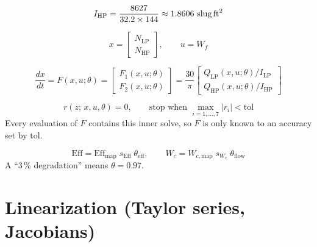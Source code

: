 \documentclass[11pt,a4paper]{article}
\begin{document}
\begin{equation}
  I_{\mathrm{HP}} = \frac{8627}{32.2 \times 144} \approx 1.8606\ \text{slug\,ft}^2
  \label{eq:inertia-hp}
\end{equation}

\begin{equation}
  x = \begin{bmatrix} N_{\mathrm{LP}} \\ N_{\mathrm{HP}} \end{bmatrix},
  \qquad u = W_f
  \label{eq:state}
\end{equation}

\begin{equation}
  \frac{dx}{dt} = F(x,u;\theta)
  = \begin{bmatrix} F_1(x,u;\theta) \\ F_2(x,u;\theta) \end{bmatrix}
  = \frac{30}{\pi}
    \begin{bmatrix}
      Q_{\mathrm{LP}}(x,u;\theta) / I_{\mathrm{LP}} \\[2pt]
      Q_{\mathrm{HP}}(x,u;\theta) / I_{\mathrm{HP}}
    \end{bmatrix}
  \label{eq:state-equation}
\end{equation}

\begin{equation}
  r(z;\,x,u,\theta) = 0, \qquad \text{stop when } \max_{i=1,\dots,7} |r_i| < \mathrm{tol}
  \label{eq:inner-solver}
\end{equation}
Every evaluation of $F$ contains this inner solve, so $F$ is only known to an
accuracy set by $\mathrm{tol}$.

\begin{equation}
  \mathrm{Eff} = \mathrm{Eff}_{\mathrm{map}}\; s_{\mathrm{Eff}}\; \theta_{\mathrm{eff}},
  \qquad
  W_c = W_{c,\mathrm{map}}\; s_{W_c}\; \theta_{\mathrm{flow}}
  \label{eq:health}
\end{equation}
A ``3\,\% degradation'' means $\theta = 0.97$.

\section{Linearization (Taylor series, Jacobians)}
\end{document}

